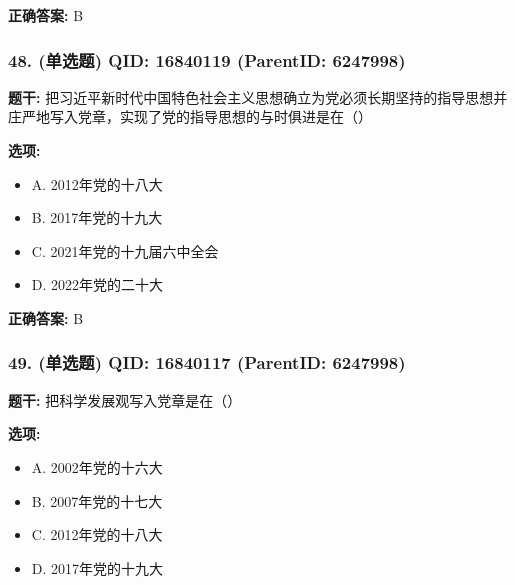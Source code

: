 \documentclass[12pt,UTF8]{ctexart}
\begin{document}
\textbf{正确答案:}
B

\vspace{0.3em}\hrulefill\vspace{0.7em}

\subsubsection*{48. (单选题) \small QID: 16840119 (ParentID: 6247998)}

\textbf{题干:}
把习近平新时代中国特色社会主义思想确立为党必须长期坚持的指导思想并庄严地写入党章，实现了党的指导思想的与时俱进是在（）



\textbf{选项:}
\begin{itemize}[leftmargin=*]

  \item A. 2012年党的十八大

  \item B. 2017年党的十九大

  \item C. 2021年党的十九届六中全会

  \item D. 2022年党的二十大

\end{itemize}

\textbf{正确答案:}
B

\vspace{0.3em}\hrulefill\vspace{0.7em}

\subsubsection*{49. (单选题) \small QID: 16840117 (ParentID: 6247998)}

\textbf{题干:}
把科学发展观写入党章是在（）



\textbf{选项:}
\begin{itemize}[leftmargin=*]

  \item A. 2002年党的十六大

  \item B. 2007年党的十七大

  \item C. 2012年党的十八大

  \item D. 2017年党的十九大

\end{itemize}
\end{document}
